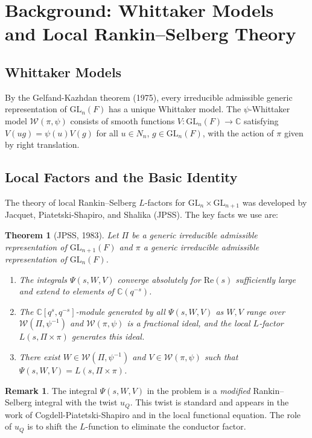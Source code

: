 \documentclass[12pt]{article}
\newtheorem{theorem}{Theorem}
\theoremstyle{definition}
\newtheorem{remark}{Remark}
\begin{document}
\section{Background: Whittaker Models and Local Rankin--Selberg Theory}

\subsection{Whittaker Models}

By the Gelfand-Kazhdan theorem (1975), every irreducible admissible generic representation of $\mathrm{GL}_n(F)$ has a unique Whittaker model. The $\psi$-Whittaker model $\mathcal{W}(\pi,\psi)$ consists of smooth functions $V\colon \mathrm{GL}_n(F) \to \mathbb{C}$ satisfying $V(ug) = \psi(u)V(g)$ for all $u \in N_n$, $g \in \mathrm{GL}_n(F)$, with the action of $\pi$ given by right translation.

\subsection{Local Factors and the Basic Identity}

The theory of local Rankin--Selberg $L$-factors for $\mathrm{GL}_n \times \mathrm{GL}_{n+1}$ was developed by Jacquet, Piatetski-Shapiro, and Shalika (JPSS). The key facts we use are:

\begin{theorem}[JPSS, 1983]\label{thm:JPSS}
Let $\Pi$ be a generic irreducible admissible representation of $\mathrm{GL}_{n+1}(F)$ and $\pi$ a generic irreducible admissible representation of $\mathrm{GL}_n(F)$.
\begin{enumerate}
\item The integrals $\Psi(s, W, V)$ converge absolutely for $\mathrm{Re}(s)$ sufficiently large and extend to elements of $\mathbb{C}(q^{-s})$.
\item The $\mathbb{C}[q^s, q^{-s}]$-module generated by all $\Psi(s,W,V)$ as $W, V$ range over $\mathcal{W}(\Pi,\psi^{-1})$ and $\mathcal{W}(\pi,\psi)$ is a fractional ideal, and the local $L$-factor $L(s,\Pi\times\pi)$ generates this ideal.
\item There exist $W \in \mathcal{W}(\Pi,\psi^{-1})$ and $V \in \mathcal{W}(\pi,\psi)$ such that $\Psi(s,W,V) = L(s,\Pi\times\pi)$.
\end{enumerate}
\end{theorem}

\begin{remark}
The integral $\Psi(s,W,V)$ in the problem is a \emph{modified} Rankin--Selberg integral with the twist $u_Q$. This twist is standard and appears in the work of Cogdell-Piatetski-Shapiro and in the local functional equation. The role of $u_Q$ is to shift the $L$-function to eliminate the conductor factor.
\end{remark}
\end{document}
